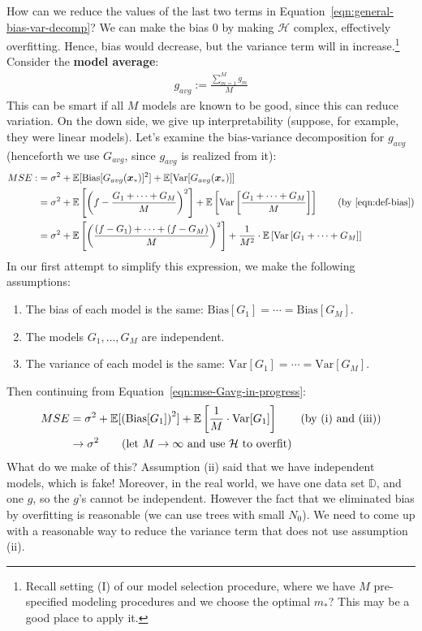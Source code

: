 \documentclass[12pt, a4paper]{article}
\theoremstyle{definition}
\begin{document}
	How can we reduce the values of the last two terms in
	Equation~\ref{eqn:general-bias-var-decomp}? We can make the bias $0$ by
	making $\mathcal{H}$ complex, effectively overfitting. Hence, bias would
	decrease, but the variance term will in increase.\footnote{Recall setting (I) of our
		model selection procedure, where we have $M$ pre-specified modeling procedures
		and we choose the optimal $m_*$? This may be a good place to apply it.}
	Consider the \textbf{model average}:
	\begin{align*}
		g_{avg} := \frac{\sum_{m=1}^{M}g_m}{M}
	\end{align*}
	This can be smart if all $M$ models are known to be good, since this can
	reduce variation. On the down side, we give up interpretability (suppose,
	for example, they were linear models). Let's examine the bias-variance decomposition
	for $g_{avg}$ (henceforth we use $G_{avg}$, since $g_{avg}$ is realized from it):
	\begin{align}
		MSE :
		&= \sigma^2 + \mathbb{E}[\text{Bias}[G_{avg}(\bm{x}_*)]^2]
		+\mathbb{E}[\text{Var}[G_{avg}(\bm{x}_{*})]]\nonumber\\
		&= \sigma^2 + \mathbb{E}\left[
			\left(
				f - \frac{G_1 + \cdots + G_M}{M} 
			\right)^2
		\right]
		+ \mathbb{E}\left[\text{Var}\left[\frac{G_1 + \cdots + G_M}{M}\right]\right]
		\tag{by \ref{eqn:def-bias}}
		\nonumber\\
		&= \sigma^2 + \mathbb{E}\left[
			\left(\frac{(f - G_1) + \cdots + (f - G_M)}{M}\right)^2
		\right]
		+ \frac{1}{M^2}\cdot \mathbb{E}\left[\text{Var}\left[G_1 + \cdots + G_M \right]\right]
		\label{eqn:mse-Gavg-in-progress}
	\end{align}
	In our first attempt to simplify this expression, we make the following assumptions:
	\begin{enumerate}[label=(\roman*)]
		\item The bias of each model is the same: $\text{Bias}[G_1]=\cdots=\text{Bias}[G_M]$.
		\item The models $G_1,\ldots,G_M$ are independent.
		\item The variance of each model is the same:
		$\text{Var}[G_1] = \cdots = \text{Var}[G_M]$.
	\end{enumerate}
	Then continuing from Equation~\ref{eqn:mse-Gavg-in-progress}:
	\begin{align*}
		MSE &=\sigma^2 + \mathbb{E}[\left(\text{Bias}[G_1]\right)^2]
		+\mathbb{E}\left[
		\frac{1}{M}\cdot \text{Var}[G_1]
		\right]
		\tag{by (i) and (iii)}\\
		&\to \sigma^2
		\tag{let $M\to\infty$ and use $\mathcal{H}$ to overfit}
	\end{align*}
	What do we make of this? Assumption (ii) said that we have independent models,
	which is fake! Moreover, in the real world, we have one data set $\mathbb{D}$,
	and one $g$, so the $g$'s cannot be independent. However the fact that we
	eliminated bias by overfitting is reasonable (we can use trees with small $N_0$).
	We need to come up with a reasonable way to reduce the variance term that does
	not use assumption (ii).
\end{document}
